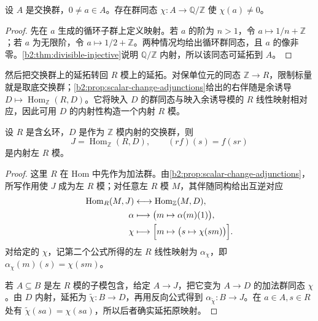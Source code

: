 \begin{lemma}\label{b2:lem:qz-separates}
	设 \(A\) 是交换群，\(0\ne a\in A\)。存在群同态 \(\chi:A\to\mathbb Q/\mathbb Z\) 使 \(\chi(a)\ne0\)。
\end{lemma}
\begin{proof}
	先在 \(a\) 生成的循环子群上定义映射。若 \(a\) 的阶为 \(n>1\)，令 \(a\mapsto 1/n+\mathbb Z\)；若 \(a\) 为无限阶，令 \(a\mapsto1/2+\mathbb Z\)。两种情况均给出循环群同态，且 \(a\) 的像非零。\cref{b2:thm:divisible-injective}说明 \(\mathbb Q/\mathbb Z\) 内射，所以该同态可延拓到 \(A\)。
\end{proof}

然后把交换群上的延拓转回 \(R\) 模上的延拓。对保单位元的同态 \(\mathbb Z\to R\)，限制标量就是取底交换群；\cref{b2:prop:scalar-change-adjunctions}给出的右伴随是余诱导 \(D\mapsto\operatorname{Hom}_{\mathbb Z}(R,D)\)。它将映入 \(D\) 的群同态与映入余诱导模的 \(R\) 线性映射相对应，因此可用 \(D\) 的内射性构造一个内射 \(R\) 模。

\begin{lemma}\label{b2:lem:coinduced-injective}
	设 \(R\) 是含幺环，\(D\) 是作为 \(\mathbb Z\) 模内射的交换群，则
	\[
		J=\operatorname{Hom}_{\mathbb Z}(R,D),\qquad (rf)(s)=f(sr)
	\]
	是内射左 \(R\) 模。
\end{lemma}
\begin{proof}
	这里 \(R\) 在 Hom 中先作为加法群。由\cref{b2:prop:scalar-change-adjunctions}，所写作用使 \(J\) 成为左 \(R\) 模；对任意左 \(R\) 模 \(M\)，其伴随同构给出互逆对应
	\[
		\begin{aligned}
			\operatorname{Hom}_R(M,J)&\longleftrightarrow\operatorname{Hom}_{\mathbb Z}(M,D),\\
			\alpha&\longmapsto\bigl(m\mapsto\alpha(m)(1)\bigr),\\
			\chi&\longmapsto\Bigl[m\mapsto\bigl(s\mapsto\chi(sm)\bigr)\Bigr].
		\end{aligned}
	\]
	对给定的 \(\chi\)，记第二个公式所得的左 \(R\) 线性映射为 \(\alpha_\chi\)，即 \(\alpha_\chi(m)(s)=\chi(sm)\)。

	若 \(A\subseteq B\) 是左 \(R\) 模的子模包含，给定 \(A\to J\)，把它变为 \(A\to D\) 的加法群同态 \(\chi\)。由 \(D\) 内射，延拓为 \(\widetilde\chi:B\to D\)，再用反向公式得到 \(\alpha_{\widetilde\chi}:B\to J\)。在 \(a\in A,s\in R\) 处有 \(\widetilde\chi(sa)=\chi(sa)\)，所以后者确实延拓原映射。
\end{proof}

